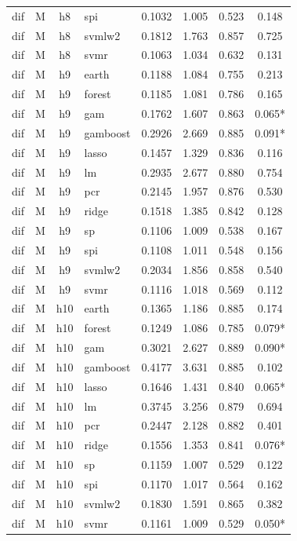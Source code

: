 \begin{ThreePartTable}
\begin{longtable}[t]{llclcccc}
dif & M & h8 & spi & 0.1032 & 1.005 & 0.523 & 0.148\\
dif & M & h8 & svmlw2 & 0.1812 & 1.763 & 0.857 & 0.725\\
dif & M & h8 & svmr & 0.1063 & 1.034 & 0.632 & 0.131\\
\addlinespace
dif & M & h9 & earth & 0.1188 & 1.084 & 0.755 & 0.213\\
dif & M & h9 & forest & 0.1185 & 1.081 & 0.786 & 0.165\\
dif & M & h9 & gam & 0.1762 & 1.607 & 0.863 & 0.065*\\
dif & M & h9 & gamboost & 0.2926 & 2.669 & 0.885 & 0.091*\\
dif & M & h9 & lasso & 0.1457 & 1.329 & 0.836 & 0.116\\
dif & M & h9 & lm & 0.2935 & 2.677 & 0.880 & 0.754\\
dif & M & h9 & pcr & 0.2145 & 1.957 & 0.876 & 0.530\\
dif & M & h9 & ridge & 0.1518 & 1.385 & 0.842 & 0.128\\
dif & M & h9 & sp & 0.1106 & 1.009 & 0.538 & 0.167\\
dif & M & h9 & spi & 0.1108 & 1.011 & 0.548 & 0.156\\
dif & M & h9 & svmlw2 & 0.2034 & 1.856 & 0.858 & 0.540\\
dif & M & h9 & svmr & 0.1116 & 1.018 & 0.569 & 0.112\\
\addlinespace
dif & M & h10 & earth & 0.1365 & 1.186 & 0.885 & 0.174\\
dif & M & h10 & forest & 0.1249 & 1.086 & 0.785 & 0.079*\\
dif & M & h10 & gam & 0.3021 & 2.627 & 0.889 & 0.090*\\
dif & M & h10 & gamboost & 0.4177 & 3.631 & 0.885 & 0.102\\
dif & M & h10 & lasso & 0.1646 & 1.431 & 0.840 & 0.065*\\
dif & M & h10 & lm & 0.3745 & 3.256 & 0.879 & 0.694\\
dif & M & h10 & pcr & 0.2447 & 2.128 & 0.882 & 0.401\\
dif & M & h10 & ridge & 0.1556 & 1.353 & 0.841 & 0.076*\\
dif & M & h10 & sp & 0.1159 & 1.007 & 0.529 & 0.122\\
dif & M & h10 & spi & 0.1170 & 1.017 & 0.564 & 0.162\\
dif & M & h10 & svmlw2 & 0.1830 & 1.591 & 0.865 & 0.382\\
dif & M & h10 & svmr & 0.1161 & 1.009 & 0.529 & 0.050*\\

\end{longtable}
\end{ThreePartTable}
